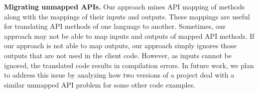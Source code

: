 \textbf{Migrating unmapped APIs.} Our approach mines API mapping of
methods along with the mappings of their inputs and outputs. These
mappings are useful for translating API methods of one language to
another. Sometimes, our approach may not be able to map inputs and
outputs of mapped API methods. If our approach is not able to map
outputs, our approach simply ignores those outputs that are not used
in the client code. However, as inputs cannot be ignored, the
translated code results in compilation errors. In future work, we
plan to address this issue by analyzing how two versions of a
project deal with a similar unmapped API problem for some other code
examples.

